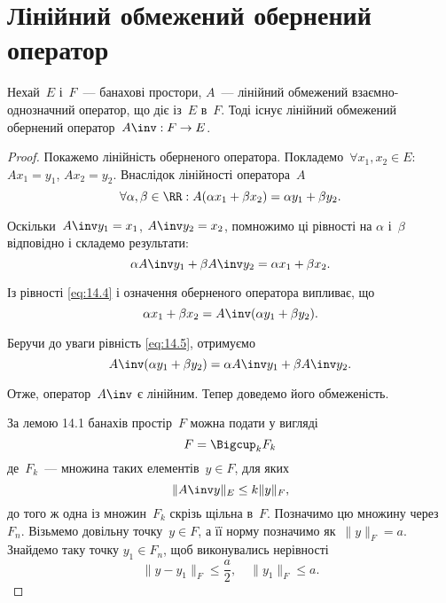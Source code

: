 \section{Лінійний обмежений обернений оператор}

\begin{theorem}
Нехай~$E$ і~$F$~--- банахові простори,
$A$~--- лінійний обмежений взаємно-однозначний оператор,
що діє із~$E$ в~$F$.
Тоді існує лінійний обмежений обернений
оператор~$A\inv: F \to E$.
\end{theorem}

\begin{proof}
Покажемо лінійність оберненого оператора.
Покладемо~$\forall x_1, x_2 \in E$: $A x_1 = y_1$, $A x_2 = y_2$.
Внаслідок лінійності оператора~$A$
\begin{equation}
    \label{eq:14.4}
    \forall \alpha, \beta \in \RR:
    A(\alpha x_1 + \beta x_2) =
    \alpha y_1 + \beta y_2.
\end{equation}

Оскільки~$A\inv y_1 = x_1$, $A\inv y_2 = x_2$, помножимо ці рівності на
$\alpha$ і~$\beta$ відповідно і складемо результати:
\begin{equation}
    \label{eq:14.5}
    \alpha A\inv y_1 + \beta A\inv y_2 =
    \alpha x_1 + \beta x_2.
\end{equation}

Із рівності \eqref{eq:14.4} і означення оберненого оператора випливає, що
\begin{equation*}
    \alpha x_1 + \beta x_2 = A\inv (\alpha y_1 + \beta y_2).
\end{equation*}

Беручи до уваги рівність \eqref{eq:14.5}, отримуємо
\begin{equation*}
    A\inv (\alpha y_1 + \beta y_2) = \alpha A\inv y_1 + \beta A\inv y_2.
\end{equation*}

Отже, оператор~$A\inv$ є лінійним. Тепер доведемо його обмеженість.

За лемою 14.1 банахів простір~$F$ можна подати у вигляді
\begin{equation*}
    F = \Bigcup_k F_k
\end{equation*}
де~$F_k$~--- множина таких елементів~$y \in F$, для яких
\begin{equation*}
    \|A\inv y\|_E \le k \|y\|_F,
\end{equation*}
до того ж одна із множин~$F_k$ скрізь щільна в~$F$. Позначимо
цю множину через~$F_n$. Візьмемо довільну точку~$y \in F$, а її
норму позначимо як~$\|y\|_F = a$. Знайдемо таку точку
$y_1 \in F_n$, щоб виконувались нерівності
\begin{equation*}
    \|y - y_1\|_F \le \frac{a}{2}, \quad \|y_1\|_F \le a.
\end{equation*}


\end{proof}
